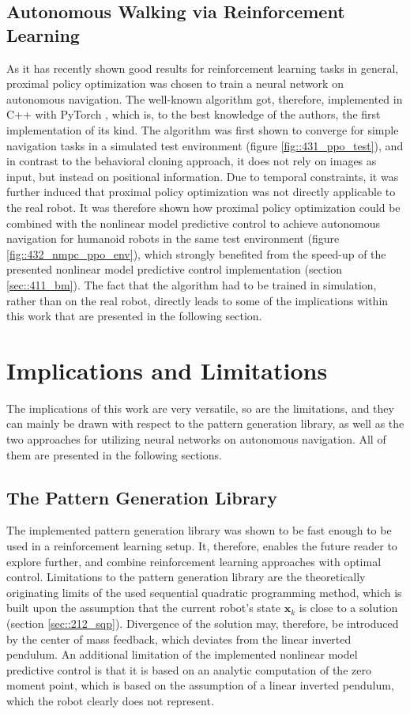 \subsection{Autonomous Walking via Reinforcement Learning}
As it has recently shown good results for reinforcement learning tasks in general, proximal policy optimization \cite{schulman2017proximal} was chosen to train a neural network on autonomous navigation. The well-known algorithm got, therefore, implemented in C++ with PyTorch \cite{paszke2017automatic}, which is, to the best knowledge of the authors, the first implementation of its kind. The algorithm was first shown to converge for simple navigation tasks in a simulated test environment (figure \ref{fig::431_ppo_test}), and in contrast to the behavioral cloning approach, it does not rely on images as input, but instead on positional information. Due to temporal constraints, it was further induced that proximal policy optimization was not directly applicable to the real robot. It was therefore shown how proximal policy optimization could be combined with the nonlinear model predictive control to achieve autonomous navigation for humanoid robots in the same test environment (figure \ref{fig::432_nmpc_ppo_env}), which strongly benefited from the speed-up of the presented nonlinear model predictive control implementation (section \ref{sec::411_bm}). The fact that the algorithm had to be trained in simulation, rather than on the real robot, directly leads to some of the implications within this work that are presented in the following section.
\section{Implications and Limitations}
The implications of this work are very versatile, so are the limitations, and they can mainly be drawn with respect to the pattern generation library, as well as the two approaches for utilizing neural networks on autonomous navigation. All of them are presented in the following sections.
\subsection{The Pattern Generation Library}
The implemented pattern generation library was shown to be fast enough to be used in a reinforcement learning setup. It, therefore, enables the future reader to explore further, and combine reinforcement learning approaches with optimal control. Limitations to the pattern generation library are the theoretically originating limits of the used sequential quadratic programming method, which is built upon the assumption that the current robot's state $\bm{x}_k$ is close to a solution (section \ref{sec::212_sqp}). Divergence of the solution may, therefore, be introduced by the center of mass feedback, which deviates from the linear inverted pendulum. An additional limitation of the implemented nonlinear model predictive control is that it is based on an analytic computation of the zero moment point, which is based on the assumption of a linear inverted pendulum, which the robot clearly does not represent.
